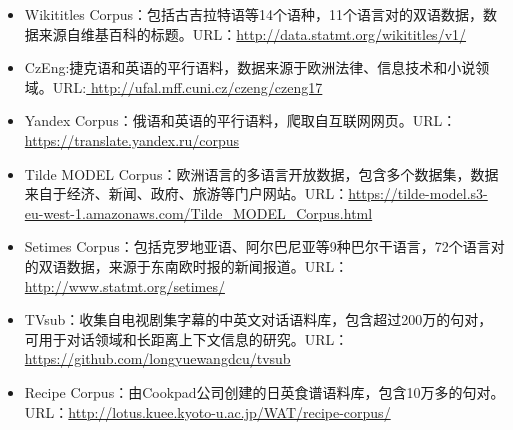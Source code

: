 \begin{appendices}
\begin{itemize}
\vspace{0.5em}
\item Wikititles Corpus：包括古吉拉特语等14个语种，11个语言对的双语数据，数据来源自维基百科的标题。URL：\url{http://data.statmt.org/wikititles/v1/}
\vspace{0.5em}
\item CzEng:捷克语和英语的平行语料，数据来源于欧洲法律、信息技术和小说领域。URL:\url{ http://ufal.mff.cuni.cz/czeng/czeng17}
\vspace{0.5em}
\item Yandex Corpus：俄语和英语的平行语料，爬取自互联网网页。URL：\url{https://translate.yandex.ru/corpus}
\vspace{0.5em}
\item Tilde MODEL Corpus：欧洲语言的多语言开放数据，包含多个数据集，数据来自于经济、新闻、政府、旅游等门户网站。URL：\url{https://tilde-model.s3-eu-west-1.amazonaws.com/Tilde_MODEL_Corpus.html}
\vspace{0.5em}
\item Setimes Corpus：包括克罗地亚语、阿尔巴尼亚等9种巴尔干语言，72个语言对的双语数据，来源于东南欧时报的新闻报道。URL：\url{http://www.statmt.org/setimes/}
\vspace{0.5em}
\item TVsub：收集自电视剧集字幕的中英文对话语料库，包含超过200万的句对，可用于对话领域和长距离上下文信息的研究。URL：\url{https://github.com/longyuewangdcu/tvsub}
\vspace{0.5em}
\item Recipe Corpus：由Cookpad公司创建的日英食谱语料库，包含10万多的句对。URL：\url{http://lotus.kuee.kyoto-u.ac.jp/WAT/recipe-corpus/}
\end{itemize}


\end{appendices}


